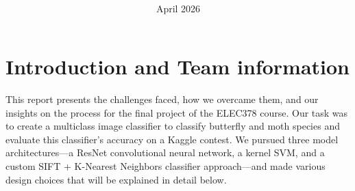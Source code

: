 \documentclass[10pt]{article} %
\title{}
\title{
  \textbf{\courseTitle} \\
  \textbf{\documentTitle} \\
  \date
  \bigskip
  \bigskip
  \bigskip
}
\author{\documentAuthor}
\date{April 2026}
\begin{document}
\maketitle

\newpage
\tableofcontents{}

\section{Introduction and Team information}
This report presents the challenges faced, how we overcame them, and our insights on the process for the final project of the ELEC378 course. Our task was to create a multiclass image classifier to classify butterfly and moth species and evaluate this classifier's accuracy on a Kaggle contest. We pursued three model architectures---a ResNet convolutional neural network, a kernel SVM, and a custom SIFT + K-Nearest Neighbors classifier approach---and made various design choices that will be explained in detail below.
\end{document}
